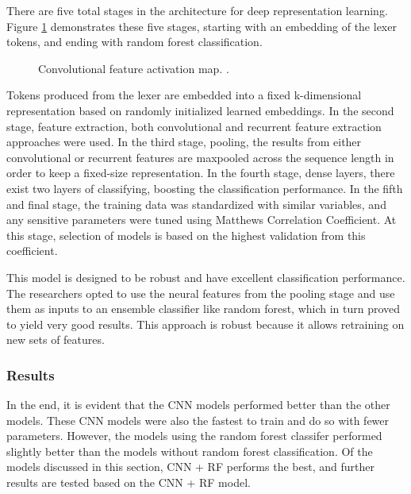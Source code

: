 \documentclass[12pt,twocolumn,letterpaper]{article}
\begin{document}
There are five total stages in the architecture for deep representation learning. Figure \ref{fig:af-3} demonstrates these
five stages, starting with an embedding of the lexer tokens, and ending with random forest classification.

\begin{figure}[h]
    \centering
    \caption{Convolutional feature activation map. \cite{Russell18}.}
    \label{fig:af-3}
\end{figure}


Tokens produced from the lexer are embedded into a fixed k-dimensional representation based on randomly initialized learned embeddings.
In the second stage, feature extraction, both convolutional and recurrent feature extraction approaches were used.
In the third stage, pooling, the results from either convolutional or recurrent features are maxpooled across the sequence length in order to
keep a fixed-size representation.
In the fourth stage, dense layers, there exist two layers of classifying, boosting the classification performance.
In the fifth and final stage, the training data was standardized with similar variables, and any sensitive parameters were tuned using Matthews Correlation Coefficient.
At this stage, selection of models is based on the highest validation from this coefficient.

This model is designed to be robust and have excellent classification performance. The researchers opted to use the
neural features from the pooling stage and use them as inputs to an ensemble classifier like random forest, which in turn
proved to yield very good results. This approach is robust because it allows retraining on new sets of features.

\subsubsection{Results}
In the end, it is evident that the CNN models performed better than the other models. These CNN models were also the fastest to train
and do so with fewer parameters. However, the models using the random forest classifer performed slightly better than the models without random forest classification.
Of the models discussed in this section, CNN + RF performs the best, and further results are tested based on the CNN + RF model.
\end{document}
